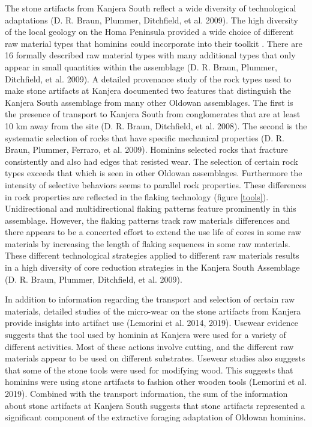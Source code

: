 \documentclass[]{elsarticle} %
\begin{document}
The stone artifacts from Kanjera South reflect a wide diversity of
technological adaptations (D. R. Braun, Plummer, Ditchfield, et al.
2009). The high diversity of the local geology on the Homa Peninsula
provided a wide choice of different raw material types that hominins
could incorporate into their toolkit . There are 16 formally described
raw material types with many additional types that only appear in small
quantities within the assemblage (D. R. Braun, Plummer, Ditchfield, et
al. 2009). A detailed provenance study of the rock types used to make
stone artifacts at Kanjera documented two features that distinguish the
Kanjera South assemblage from many other Oldowan assemblages. The first
is the presence of transport to Kanjera South from conglomerates that
are at least 10 km away from the site (D. R. Braun, Ditchfield, et al.
2008). The second is the systematic selection of rocks that have
specific mechanical properties (D. R. Braun, Plummer, Ferraro, et al.
2009). Hominins selected rocks that fracture consistently and also had
edges that resisted wear. The selection of certain rock types exceeds
that which is seen in other Oldowan assemblages. Furthermore the
intensity of selective behaviors seems to parallel rock properties.
These differences in rock properties are reflected in the flaking
technology (figure \ref{tools}). Unidirectional and multidirectional
flaking patterns feature prominently in this assemblage. However, the
flaking patterns track raw materials differences and there appears to be
a concerted effort to extend the use life of cores in some raw materials
by increasing the length of flaking sequences in some raw materials.
These different technological strategies applied to different raw
materials results in a high diversity of core reduction strategies in
the Kanjera South Assemblage (D. R. Braun, Plummer, Ditchfield, et al.
2009).

In addition to information regarding the transport and selection of
certain raw materials, detailed studies of the micro-wear on the stone
artifacts from Kanjera provide insights into artifact use (Lemorini et
al. 2014, 2019). Usewear evidence suggests that the tool used by hominin
at Kanjera were used for a variety of different activities. Most of
these actions involve cutting, and the different raw materials appear to
be used on different substrates. Usewear studies also suggests that some
of the stone tools were used for modifying wood. This suggests that
hominins were using stone artifacts to fashion other wooden tools
(Lemorini et al. 2019). Combined with the transport information, the sum
of the information about stone artifacts at Kanjera South suggests that
stone artifacts represented a significant component of the extractive
foraging adaptation of Oldowan hominins.
\end{document}
